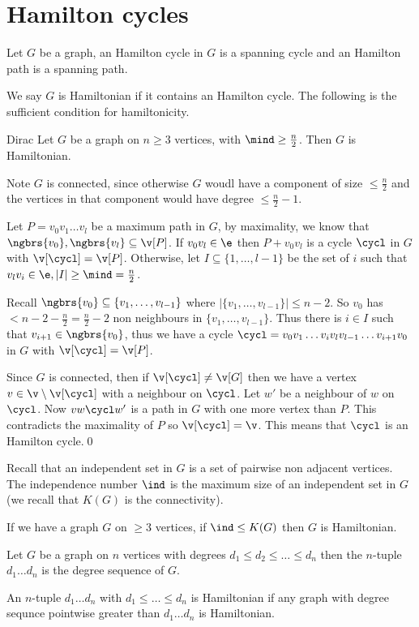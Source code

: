 \chapter{Hamilton cycles}
\begin{definition}
    Let $G$ be a graph, an Hamilton cycle in $G$ is a spanning cycle and an Hamilton path is a spanning path.
\end{definition}
We say $G$ is Hamiltonian if it contains an Hamilton cycle. The following is the sufficient condition for hamiltonicity.
\begin{customtheorem}{Dirac}
\label{theorem:dirac}
    Let $G$ be a graph on $n \geq 3$ vertices, with $\mind \geq \frac{n}{2}$. Then $G$ is Hamiltonian.
\end{customtheorem}
\begin{prf}
    Note $G$ is connected, since otherwise $G$ woudl have a component of size $\leq \frac{n}{2}$ and the vertices in that component would have degree $\leq \frac{n}{2} - 1$.

    Let $P = v_0v_1\dots v_l$ be a maximum path in $G$, by maximality, we know that $\ngbrs{v_0}, \ngbrs{v_l} \subseteq \v[P]$. If $v_0v_l \in \e$ then $P + v_0v_l$ is a cycle $\cycl$ in $G$ with $\v[\cycl] = \v[P]$. Otherwise, let $I \subseteq \{1, \dots, l - 1\}$ be the set of $i$ such that $v_lv_i \in \e, |I| \geq \mind = \frac{n}{2}$.

    Recall $\ngbrs{v_0} \subseteq \{v_1, \dots, v_{l - 1}\}$ where $|\{v_1, \dots, v_{l - 1}\}| \leq n - 2$. So $v_0$ has $< n - 2 - \frac{n}{2} = \frac{n}{2} - 2$ non neighbours in $\{v_1, \dots, v_{l - 1}\}$. Thus there is $i \in I$ such that $v_{i + 1} \in \ngbrs{v_0}$, thus we have a cycle $\cycl = v_0v_1 \dots v_iv_lv_{l - 1} \dots v_{i + 1}v_0$ in $G$ with $\v[\cycl] = \v[P]$.

    Since $G$ is connected, then if $\v[\cycl] \neq \v[G]$ then we have a vertex $v \in \v \setminus \v[\cycl]$ with a neighbour on $\cycl$. Let $w'$ be a neighbour of $w$ on $\cycl$. Now $vw\cycl w'$ is a path in $G$ with one more vertex than $P$. This contradicts the maximality of $P$ so $\v[\cycl] = \v$. This means that $\cycl$ is an Hamilton cycle.\qed
\end{prf}
Recall that an independent set in $G$ is a set of pairwise non adjacent vertices. The independence number $\ind$ is the maximum size of an independent set in $G$ (we recall that $K(G)$ is the connectivity).
\begin{customtheorem}{5.2}
\label{theorem:5.2}
    If we have a graph $G$ on $\geq 3$ vertices, if $\ind \leq K(G)$ then $G$ is Hamiltonian.
\end{customtheorem}
\begin{definition}
    Let $G$ be a graph on $n$ vertices with degrees $d_1 \leq d_2 \leq \dots \leq d_n$ then the $n$-tuple $d_1 \dots d_n$ is the degree sequence of $G$.
\end{definition}
An $n$-tuple $d_1 \dots d_n$ with $d_1 \leq \dots \leq d_n$ is Hamiltonian if any graph with degree sequnce pointwise greater than $d_1 \dots d_n$ is Hamiltonian.